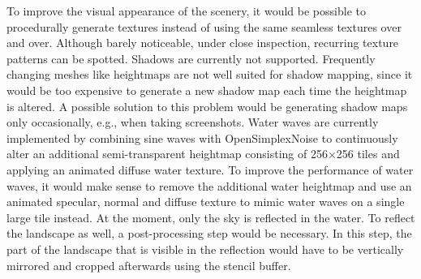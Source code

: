 \documentclass[11pt,a4paper,twoside,openright]{report}
\begin{document}
To improve the visual appearance of the scenery, it would be possible to procedurally generate textures instead of using the same seamless textures over and over. Although barely noticeable, under close inspection, recurring texture patterns can be spotted.
Shadows are currently not supported. Frequently changing meshes like heightmaps are not well suited for shadow mapping, since it would be too expensive to generate a new shadow map each time the heightmap is altered. A possible solution to this problem would be generating shadow maps only occasionally, e.g., when taking screenshots.
Water waves are currently implemented by combining sine waves with OpenSimplexNoise to continuously alter an additional semi-transparent heightmap consisting of 256$\times$256 tiles and applying an animated diffuse water texture. To improve the performance of water waves, it would make sense to remove the additional water heightmap and use an animated specular, normal and diffuse texture to mimic water waves on a single large tile instead.
At the moment, only the sky is reflected in the water. To reflect the landscape as well, a post-processing step would be necessary. In this step, the part of the landscape that is visible in the reflection would have to be vertically mirrored and cropped afterwards using the stencil buffer.





\appendix
\end{document}
